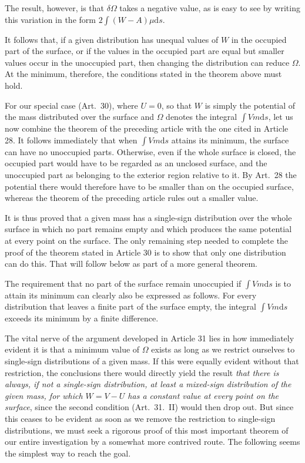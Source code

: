 The result, however, is that $\delta\Omega$ takes a negative value, as is easy to see by writing this variation in the form $2\int(W-A)\mu\mathrm ds$.

It follows that, if a given distribution has unequal values of $W$ in the occupied part of the surface, or if the values in the occupied part are equal but smaller values occur in the unoccupied part, then changing the distribution can reduce $\Omega$. At the minimum, therefore, the conditions stated in the theorem above must hold.

For our special case (Art.\ 30), where $U=0$, so that $W$ is simply the potential of the mass distributed over the surface and $\Omega$ denotes the integral $\int Vm\mathrm ds$, let us now combine the theorem of the preceding article with the one cited in Article 28. It follows immediately that when $\int Vm\mathrm ds$ attains its minimum, the surface can have no unoccupied parts. Otherwise, even if the whole surface is closed, the occupied part would have to be regarded as an unclosed surface, and the unoccupied part as belonging to the exterior region relative to it. By Art.\ 28 the potential there would therefore have to be smaller than on the occupied surface, whereas the theorem of the preceding article rules out a smaller value.

It is thus proved that a given mass has a single-sign distribution over the whole surface in which no part remains empty and which produces the same potential at every point on the surface. The only remaining step needed to complete the proof of the theorem stated in Article 30 is to show that only one distribution can do this. That will follow below as part of a more general theorem.

The requirement that no part of the surface remain unoccupied if $\int Vm\mathrm ds$ is to attain its minimum can clearly also be expressed as follows.
For every distribution that leaves a finite part of the surface empty, the integral $\int Vm\mathrm ds$ exceeds its minimum by a finite difference.

The vital nerve of the argument developed in Article 31 lies in how immediately evident it is that a minimum value of $\Omega$ exists as long as we restrict ourselves to single-sign distributions of a given mass. If this were equally evident without that restriction, the conclusions there would directly yield the result \textit{that there is always, if not a single-sign distribution, at least a mixed-sign distribution of the given mass, for which $W=V-U$ has a constant value at every point on the surface}, since the second condition (Art.\ 31.\ II) would then drop out. But since this ceases to be evident as soon as we remove the restriction to single-sign distributions, we must seek a rigorous proof of this most important theorem of our entire investigation by a somewhat more contrived route. The following seems the simplest way to reach the goal.

